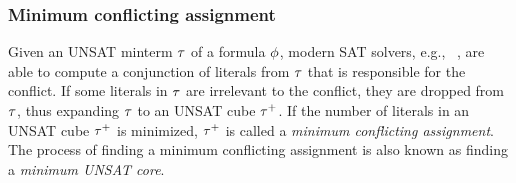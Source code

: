 \subsubsection{Minimum conflicting assignment}
Given an UNSAT minterm $\tau$ of a formula $\phi$,
modern SAT solvers, e.g., \minisat~\cite{Een2003Solver,Een2003Incremental},
are able to compute a conjunction of literals from $\tau$ that is responsible for the conflict.
If some literals in $\tau$ are irrelevant to the conflict,
they are dropped from $\tau$,
thus expanding $\tau$ to an UNSAT cube $\tau^+$.
If the number of literals in an UNSAT cube $\tau^+$ is minimized,
$\tau^+$ is called a \textit{minimum conflicting assignment}.
The process of finding a minimum conflicting assignment is also known as finding a \textit{minimum UNSAT core}.